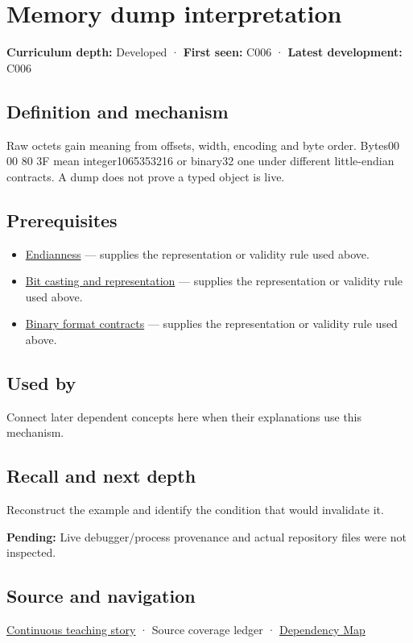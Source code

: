 \hypertarget{appendix-230b59c0676b}{}\label{referencestart:appendix-230b59c0676b}
\section{Memory dump interpretation}\label{appendix-230b59c0676b-memory-dump-interpretation}

\textbf{Curriculum depth:} Developed · \textbf{First seen:} C006 · \textbf{Latest development:} C006

\subsection{Definition and mechanism}\label{appendix-230b59c0676b-definition-and-mechanism}

Raw octets gain meaning from offsets, width, encoding and byte order. Bytes00 00 80 3F mean integer1065353216 or binary32 one under different little-endian contracts. A dump does not prove a typed object is live.

\subsection{Prerequisites}\label{appendix-230b59c0676b-prerequisites}

\begin{itemize}
\tightlist
\item
  \hyperref[appendix-bc07c3d25b18]{Endianness} --- supplies the representation or validity rule used above.
\item
  \hyperref[appendix-34ee45f161c1]{Bit casting and representation} --- supplies the representation or validity rule used above.
\item
  \hyperref[appendix-590bbb2424c1]{Binary format contracts} --- supplies the representation or validity rule used above.
\end{itemize}

\subsection{Used by}\label{appendix-230b59c0676b-used-by}

Connect later dependent concepts here when their explanations use this mechanism.

\subsection{Recall and next depth}\label{appendix-230b59c0676b-recall-and-next-depth}

Reconstruct the example and identify the condition that would invalidate it.

\textbf{Pending:} Live debugger/process provenance and actual repository files were not inspected.

\subsection{Source and navigation}\label{appendix-230b59c0676b-source-and-navigation}

\hyperref[01-foundations-i-ch002-bytes-become-a-durable-agreement]{Continuous teaching story} · {Source coverage ledger} · \hyperref[appendix-4ad47bdd269a]{Dependency Map}
